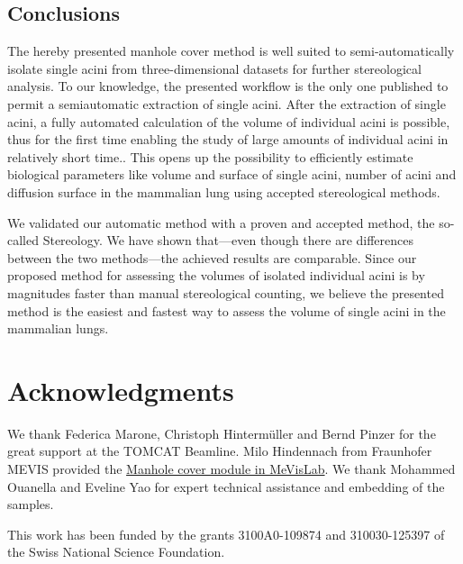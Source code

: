 \documentclass[twoside,paper=a4,abstract=true,english,DIVcalc]{scrartcl}
\begin{document}
\subsection{Conclusions}
The hereby presented manhole cover method is well suited to semi-automatically isolate single acini from three-dimensional datasets for further stereological analysis. To our knowledge, the presented workflow is the only one published to permit a semiautomatic extraction of single acini. After the extraction of single acini, a fully automated calculation of the volume of individual acini is possible, thus for the first time enabling the study of large amounts of individual acini in relatively short time.. This opens up the possibility to efficiently estimate biological parameters like volume and surface of single acini, number of acini and diffusion surface in the mammalian lung using accepted stereological methods.

We validated our automatic method with a proven and accepted method, the so-called Stereology. We have shown that---even though there are differences between the two methods---the achieved results are comparable. Since our proposed method for assessing the volumes of isolated individual acini is by magnitudes faster than manual stereological counting, we believe the presented method is the easiest and fastest way to assess the volume of single acini in the mammalian lungs.

\clearpage
\section{Acknowledgments}
We thank Federica Marone, Christoph Hintermüller and Bernd Pinzer for the great support at the TOMCAT Beamline. Milo Hindennach from Fraunhofer MEVIS provided the \href{http://www.mevis-research.de/cgi-bin/discus/board-auth.cgi?lm=1282233250&file=/839/11760.html}{Manhole cover module in MeVisLab}. We thank Mohammed Ouanella and Eveline Yao for expert technical assistance and embedding of the samples.

This work has been funded by the grants 3100A0-109874 and 310030-125397 of the Swiss National Science Foundation.

\clearpage
\singlespacing


\end{document}
